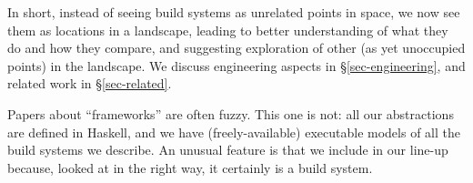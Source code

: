 In short, instead of seeing build systems as unrelated
points in space, we now see them as locations in a landscape,
leading to better understanding of what they do and how they compare,
and suggesting exploration of other (as yet unoccupied points) in the
landscape.
We discuss engineering aspects in \S\ref{sec-engineering}, and related
work in \S\ref{sec-related}.

Papers about ``frameworks'' are often fuzzy.  This one is not: all our
abstractions are defined in Haskell, and we have (freely-available)
executable models of all the build systems we describe.  An unusual
feature is that we include \Excel in our line-up because, looked at
in the right way, it certainly is a build system.
